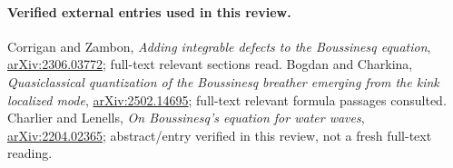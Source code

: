 \documentclass[11pt,a4paper]{article}
\begin{document}
\paragraph{Verified external entries used in this review.}
Corrigan and Zambon, \emph{Adding integrable defects to the Boussinesq equation},
\href{https://arxiv.org/abs/2306.03772}{arXiv:2306.03772}; full-text relevant
sections read. Bogdan and Charkina, \emph{Quasiclassical quantization of the
Boussinesq breather emerging from the kink localized mode},
\href{https://arxiv.org/abs/2502.14695}{arXiv:2502.14695}; full-text relevant
formula passages consulted. Charlier and Lenells, \emph{On Boussinesq's
equation for water waves},
\href{https://arxiv.org/abs/2204.02365}{arXiv:2204.02365}; abstract/entry
verified in this review, not a fresh full-text reading.
\end{document}
